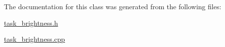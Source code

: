 The documentation for this class was generated from the following files\+:\begin{DoxyCompactItemize}
\item 
\hyperlink{task__brightness_8h}{task\+\_\+brightness.\+h}\item 
\hyperlink{task__brightness_8cpp}{task\+\_\+brightness.\+cpp}\end{DoxyCompactItemize}
